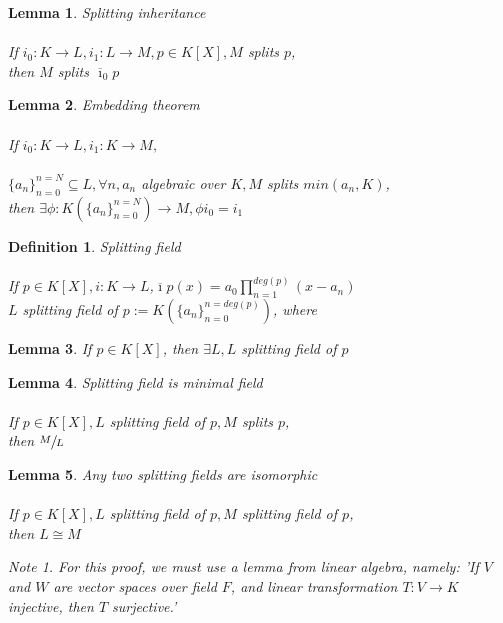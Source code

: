 \documentclass{article}
\theoremstyle{definitionstyle}
\newtheorem{defn}{Definition}[section]
\theoremstyle{lemmastyle}
\newtheorem{lem}{Lemma}[section]
\theoremstyle{remark}
\newtheorem*{note}{Note}
\newcommand{\ibar}{\overline{\imath}}
\begin{document}
\begin{lem} Splitting inheritance\\
\\
If $i_0 : K \to L, i_1 : L \to M, p \in K[X], M$ splits $p$,\\

then $M$ splits $\ibar_0 p$ \end{lem}
\begin{lem} Embedding theorem\\
\\
If $i_0 : K \to L, i_1 : K \to M,$\\
\\
$\{a_n\}_{n=0}^{n=N} \subseteq L, \forall n, a_n$ algebraic over $K, M$ splits $min(a_n, K)$,\\

then $\exists \phi : K(\{a_n\}_{n=0}^{n=N}) \to M, \phi i_0 = i_1$
\end{lem}
\begin{defn} Splitting field\\
\\
If $p \in K[X], i : K \to L$,$\ibar p(x) = a_0 \displaystyle \prod_{n=1}^{deg(p)} (x -  a_n)$\\

$L$ splitting field of $p := K(\{a_n\}_{n=0}^{n=deg(p)})$, where
\end{defn}

\begin{lem} If $p \in K[X]$, then $\exists L, L$ splitting field of $p$\end{lem}
\begin{lem} Splitting field is minimal field\\
\\
If $p \in K[X], L$ splitting field of $p, M$ splits $p$,\\

then $\sfrac{M}{L}$\end{lem}

\begin{lem} Any two splitting fields are isomorphic\\
\\
If $p \in K[X], L$ splitting field of $p, M$ splitting field of $p$,\\

then $L \cong M$

\begin{note} For this proof, we must use a lemma from linear algebra, namely: 'If $V$ and $W$ are vector spaces over field $F$, and linear transformation $T : V \to K$ injective, then $T$ surjective.' \end{note}\end{lem}
\end{document}
